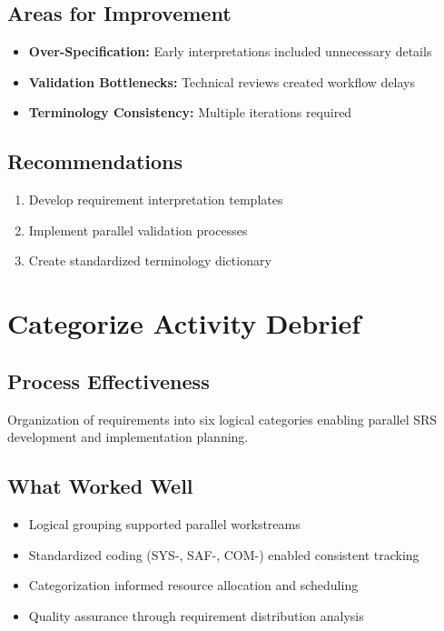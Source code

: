 \documentclass[12pt,a4paper]{article}
\begin{document}
\subsection{Areas for Improvement}
\begin{itemize}
    \item \textbf{Over-Specification:} Early interpretations included unnecessary details
    \item \textbf{Validation Bottlenecks:} Technical reviews created workflow delays
    \item \textbf{Terminology Consistency:} Multiple iterations required
\end{itemize}

\subsection{Recommendations}
\begin{enumerate}
    \item Develop requirement interpretation templates
    \item Implement parallel validation processes
    \item Create standardized terminology dictionary
\end{enumerate}

\section{Categorize Activity Debrief}

\subsection{Process Effectiveness}
Organization of requirements into six logical categories enabling parallel SRS development and implementation planning.

\subsection{What Worked Well}
\begin{itemize}
    \item Logical grouping supported parallel workstreams
    \item Standardized coding (SYS-, SAF-, COM-) enabled consistent tracking
    \item Categorization informed resource allocation and scheduling
    \item Quality assurance through requirement distribution analysis
\end{itemize}
\end{document}
